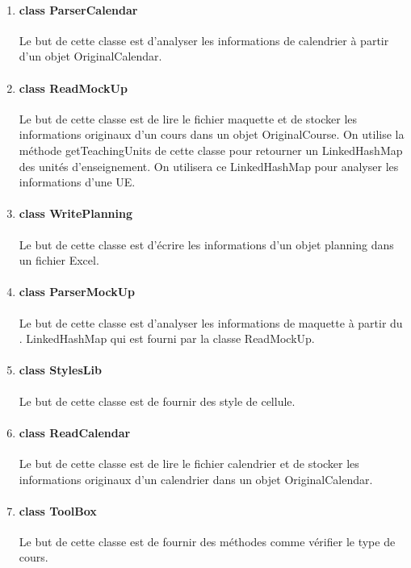 \documentclass{polytech/polytech}
\begin{document}
\begin{enumerate}
			\item \paragraph{class ParserCalendar}
			Le but de cette classe est d'analyser les informations de calendrier à partir d'un objet OriginalCalendar.
			\item \paragraph{class ReadMockUp}
			Le but de cette classe est de lire le fichier maquette et de stocker les informations originaux d'un cours dans un objet OriginalCourse. On utilise la méthode getTeachingUnits de cette classe pour retourner un LinkedHashMap des unités d'enseignement. On utilisera ce LinkedHashMap pour analyser les informations d'une UE.
			\item \paragraph{class WritePlanning}
			Le but de cette classe est d'écrire les informations d'un objet planning dans un fichier Excel.
			\item \paragraph{class ParserMockUp}
			Le but de cette classe est d'analyser les informations de maquette à partir du . LinkedHashMap qui est fourni par la classe ReadMockUp.
			\item \paragraph{class StylesLib}
			Le but de cette classe est de fournir des style de cellule.
			\item \paragraph{class ReadCalendar}
			Le but de cette classe est de lire le fichier calendrier et de stocker les informations originaux d'un calendrier dans un objet OriginalCalendar.
			\item \paragraph{class ToolBox}
			Le but de cette classe est de fournir des méthodes comme vérifier le type de cours.
		\end{enumerate}
\end{document}
